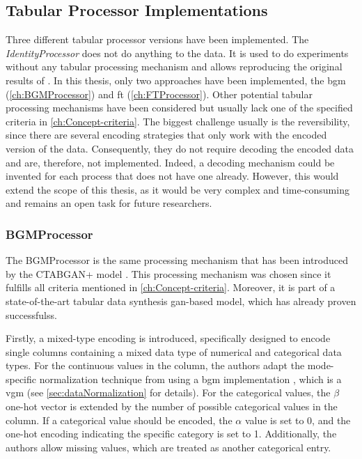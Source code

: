 \subsection{Tabular Processor Implementations}
\label{ch:architecture-tabularProcessor-implementations}

Three different tabular processor versions have been implemented.
The \textit{IdentityProcessor} does not do anything to the data.
It is used to do experiments without any tabular processing mechanism and allows reproducing the original results of \cite{kotelnikov2022TabDDPMModellingTabular}.
In this thesis, only two approaches have been implemented, the \gls{bgm} (\autoref{ch:BGMProcessor}) and \gls{ft} (\autoref{ch:FTProcessor}).
Other potential tabular processing mechanisms have been considered but usually lack one of the specified criteria in \autoref{ch:Concept-criteria}.
The biggest challenge usually is the reversibility, since there are several encoding strategies that only work with the encoded version of the data.
Consequently, they do not require decoding the encoded data and are, therefore, not implemented.
Indeed, a decoding mechanism could be invented for each process that does not have one already.
However, this would extend the scope of this thesis, as it would be very complex and time-consuming and remains an open task for future researchers.

\subsubsection{BGMProcessor}
\label{ch:BGMProcessor}

The BGMProcessor is the same processing mechanism that has been introduced by the CTABGAN+ model \cite{zhao2022CTABGANEnhancingTabular}.
This processing mechanism was chosen since it fulfills all criteria mentioned in \autoref{ch:Concept-criteria}.
Moreover, it is part of a state-of-the-art tabular data synthesis \gls{gan}-based model, which has already proven successfulss.

Firstly, a mixed-type encoding is introduced, specifically designed to encode single columns containing a mixed data type of numerical and categorical data types.
For the continuous values in the column, the authors adapt the mode-specific normalization technique from \cite{xu2019ModelingTabularData} using a \gls{bgm} implementation \cite{BayesianGaussianMixture}, which is a \gls{vgm} (see \autoref{sec:dataNormalization} for details).
For the categorical values, the $\beta$ one-hot vector is extended by the number of possible categorical values in the column.
If a categorical value should be encoded, the $\alpha$ value is set to 0, and the one-hot encoding indicating the specific category is set to 1.
Additionally, the authors allow missing values, which are treated as another categorical entry.

